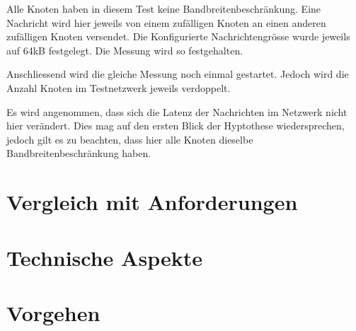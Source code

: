 Alle Knoten haben in diesem Test keine Bandbreitenbeschränkung.
Eine Nachricht wird hier jeweils von einem zufälligen Knoten an einen anderen zufälligen Knoten versendet.
Die Konfigurierte Nachrichtengrösse wurde jeweils auf 64kB festgelegt.
Die Messung wird so festgehalten.

Anschliessend wird die gleiche Messung noch einmal gestartet.
Jedoch wird die Anzahl Knoten im Testnetzwerk jeweils verdoppelt.

Es wird angenommen, dass sich die Latenz der Nachrichten im Netzwerk nicht hier verändert.
Dies mag auf den ersten Blick der Hyptothese wiedersprechen, jedoch gilt es zu beachten, dass hier alle Knoten dieselbe Bandbreitenbeschränkung haben.



\section{}



\section{Vergleich mit Anforderungen}
\label{sec:VergleichAnforderungen}

\seereq{}



\section{Technische Aspekte}

\section{Vorgehen}
